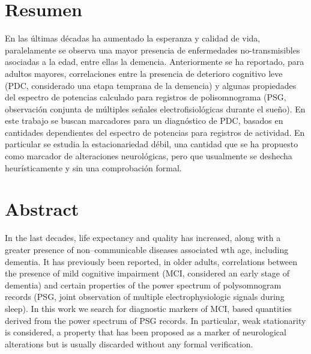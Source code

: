 \documentclass[12pt,letterpaper]{book}
\begin{document}
\setcounter{page}{1}

\chapter*{Resumen}

En las últimas décadas ha aumentado la esperanza y calidad de vida, paralelamente se observa una 
mayor presencia de enfermedades no-transmisibles asociadas a la edad, entre ellas la demencia.
%
Anteriormente se ha reportado, para adultos mayores, correlaciones entre la presencia de deterioro
cognitivo leve (PDC, considerado una etapa temprana de la demencia) y algunas propiedades del 
espectro  de potencias calculado para registros de polisomnograma (PSG, observación conjunta de 
múltiples señales electrofisiológicas durante el sueño).%
%
En este trabajo se buscan marcadores para un diagnóstico de PDC, basados en cantidades dependientes
del espectro de potencias para registros de actividad. En particular se estudia la estacionariedad 
débil, una cantidad que se ha propuesto como marcador de alteraciones neurológicas, %
pero que usualmente se deshecha heurísticamente y sin una comprobación formal.
%


\chapter*{Abstract}

In the last decades, life expectancy and quality has increased, along with a greater presence of
non--communicable diseases associated wth age, including dementia.
%
It has previously been reported, in older adults, correlations between the presence of mild 
cognitive impairment (MCI, considered an early stage of dementia) and certain properties of the power 
spectrum of polysomnogram records (PSG, joint observation of multiple electrophysiologic signals 
during sleep).%
%
In this work we search for diagnostic markers of MCI, based quantities derived from the power 
spectrum of PSG records.
%
In particular, weak stationarity is considered, a property that has been proposed as a marker of 
neurological alterations %
but is usually discarded without any formal verification. 
%
\end{document}
